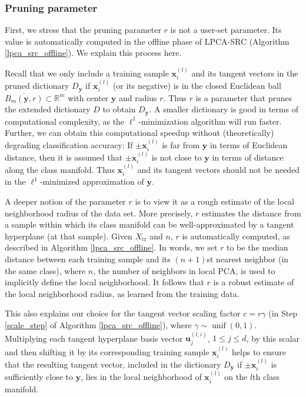\documentclass[review]{elsarticle}
\newcommand{\unif}{\operatorname{unif}}
\begin{document}
\subsubsection{Pruning parameter} \label{sec:pruning}

First, we stress that the pruning parameter $r$ is not a user-set parameter. Its value is automatically computed in the offline phase of LPCA-SRC (Algorithm \ref{lpca_src_offline}). We explain this process here.

Recall that we only include a training sample $\bm{x}_i^{(l)}$ and its tangent vectors in the pruned dictionary $D_{\bm{y}}$ if $\bm{x}_i^{(l)}$ (or its negative) is in the closed Euclidean ball $\overline{B_m(\bm{y}, r)} \subset \mathbb{R}^m$ with center $\bm{y}$ and radius $r$. Thus $r$ is a parameter that prunes the extended dictionary $D$ to obtain $D_{\bm{y}}$. A smaller dictionary is good in terms of computational complexity, as the $\ell^1$-minimization algorithm will run faster. Further, we can obtain this computational speedup without (theoretically) degrading classification accuracy: If $\pm\bm{x}_i^{(l)}$ is far from $\bm{y}$ in terms of Euclidean distance, then it is assumed that $\pm\bm{x}_i^{(l)}$ is not close to $\bm{y}$ in terms of distance along the class manifold. Thus $\bm{x}_i^{(l)}$ and its tangent vectors should not be needed in the $\ell^1$-minimized approximation of $\bm{y}$.

A deeper notion of the parameter $r$ is to view it as a rough estimate of the local neighborhood radius of the data set. More precisely, $r$ estimates the distance from a sample within which its class manifold can be well-approximated by a tangent hyperplane (at that sample). Given $X_{\mathrm{tr}}$ and $n$, $r$ is automatically computed, as described in Algorithm \ref{lpca_src_offline}. In words, we set $r$ to be the median distance between each training sample and its $(n+1)$st nearest neighbor (in the same class), where $n$, the number of neighbors in local PCA, is used to implicitly define the local neighborhood. It follows that $r$ is a robust estimate of the local neighborhood radius, as learned from the training data. 

This also explains our choice for the tangent vector scaling factor $c = r \gamma$ (in Step \ref{scale_step} of Algorithm \ref{lpca_src_offline}), where $\gamma \sim \unif(0,1)$. Multiplying each tangent hyperplane basis vector $\bm{u}_j^{(l,i)}$, $1\leq j \leq d$, by this scalar and then shifting it by its corresponding training sample $\bm{x}_i^{(l)}$ helps to ensure that the resulting tangent vector, included in the dictionary $D_{\bm{y}}$ if $\pm\bm{x}_i^{(l)}$ is sufficiently close to $\bm{y}$, lies in the local neighborhood of $\bm{x}_i^{(l)}$ on the $l$th class manifold.
\end{document}

